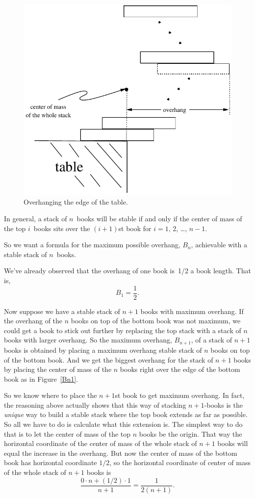 \begin{figure}
\centerline{\includegraphics[width=.6\textwidth]{figures/drafts/bookstack-2}}
\caption{Overhanging the edge of the table.}
\label{overhang}
\end{figure}

In general, a stack of $n$~books will be stable if and only if the
center of mass of the top $i$~books sits over the $(i + 1)$st book
for $i = 1$, 2, \dots, $n - 1$.

So we want a formula for the maximum possible overhang, $B_n$, achievable
with a stable stack of $n$~books.

We've already observed that the overhang of one book is~1/2 a book
length.  That is,
\[
    B_1 = \frac{1}{2}.
\]

Now suppose we have a stable stack of $n+1$ books with maximum overhang.
If the overhang of the $n$ books on top of the bottom book was not
maximum, we could get a book to stick out further by replacing the top
stack with a stack of $n$ books with larger overhang.  So the maximum
overhang, $B_{n+1}$, of a stack of $n+1$ books is obtained by placing a
maximum overhang stable stack of $n$ books on top of the bottom book.  And
we get the biggest overhang for the stack of $n+1$ books by placing the
center of mass of the $n$ books right over the edge of the bottom book as
in Figure~\ref{Bn1}.

So we know where to place the $n+1$st book to get maximum overhang.
In fact, the reasoning above actually shows that this way of stacking
$n+1$-books is the \emph{unique} way to build a stable stack where the
top book extends as far as possible.  So all we have to do is
calculate what this extension is.  The simplest way to do that is to
let the center of mass of the top $n$ books be the origin.  That way
the horizontal coordinate of the center of mass of the whole stack of
$n+1$ books will equal the increase in the overhang.  But now the
center of mass of the bottom book has horizontal coordinate $1/2$, so
the horizontal coordinate of center of mass of the whole stack of
$n+1$ books is
\[
\frac{0 \cdot n + (1/2) \cdot 1}{n+1} = \frac{1}{2(n +1)}.
\]

